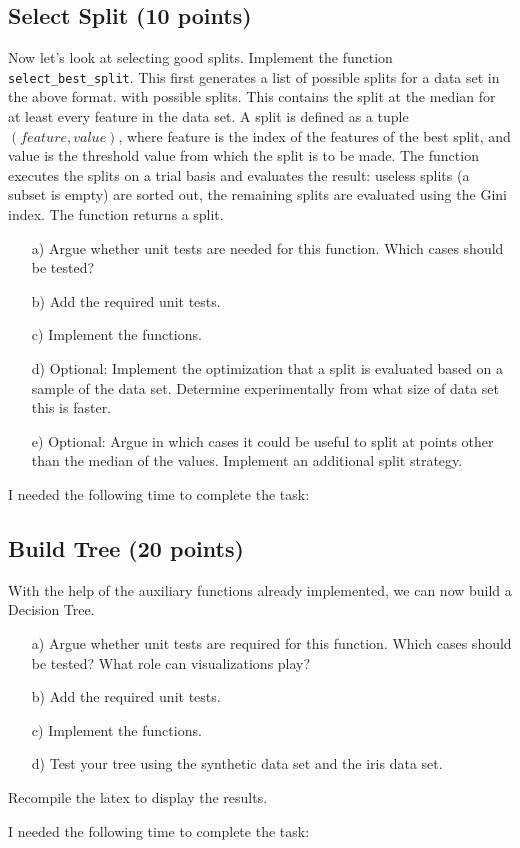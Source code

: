 \documentclass{article}
\begin{document}
\subsection{Select Split (10 points)}

Now let's look at selecting good splits. Implement the function \texttt{select\_best\_split}. This first generates a list of possible splits for a data set in the above format.
with possible splits. This contains the split at the median for at least every feature in the data set. A split is defined as a tuple $( feature, value )$, where feature is the index of the
features of the best split, and value is the threshold value from which the split is to be made. The function executes the splits on a trial basis and evaluates the result: useless splits
(a subset is empty) are sorted out, the remaining splits are evaluated using the Gini index. The function returns a split. 

\begin{enumerate}

\item[a)] Argue whether unit tests are needed for this function. Which cases should be tested?

\item[b)] Add the required unit tests.

\item[c)] Implement the functions.

\item[d)] Optional: Implement the optimization that a split is evaluated based on a sample of the data set. Determine experimentally from what size of data set this is faster.

\item[e)] Optional: Argue in which cases it could be useful to split at points other than the median of the values. Implement an additional split strategy.

\end{enumerate}

I needed the following time to complete the task:

\subsection{Build Tree (20 points)}

With the help of the auxiliary functions already implemented, we can now build a Decision Tree. 

\begin{enumerate}

\item[a)] Argue whether unit tests are required for this function. Which cases should be tested? What role can visualizations play? 

\item[b)] Add the required unit tests.

\item[c)] Implement the functions.

\item[d)] Test your tree using the synthetic data set and the iris data set.

\end{enumerate}

Recompile the latex to display the results.

I needed the following time to complete the task:
\end{document}
